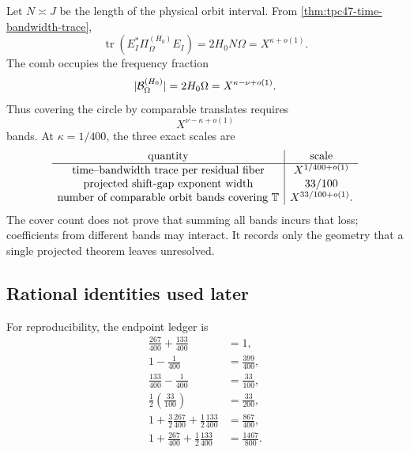 Let \(N\asymp J\) be the length of the physical orbit interval.  From
\cref{thm:tpc47-time-bandwidth-trace},
\begin{equation}
 \operatorname{tr}
 (E_I^*\Pi_{\Omega}^{(H_0)}E_I)
 =2H_0N\Omega
 =X^{\kappa+o(1)}.
 \label{eq:tpc47-shannon-exponent}
\end{equation}
The comb occupies the frequency fraction
\begin{equation}
 |\mathcal B_{\Omega}^{(H_0)}|
 =2H_0\Omega=X^{\kappa-\nu+o(1)}.
 \label{eq:tpc47-band-fraction}
\end{equation}
Thus covering the circle by comparable translates requires
\begin{equation}
 X^{\nu-\kappa+o(1)}
 \label{eq:tpc47-cover-count}
\end{equation}
bands.  At \(\kappa=1/400\), the three exact scales are
\begin{equation}
 \begin{array}{c|c}
 \text{quantity}&\text{scale}\\ \hline
 \text{time--bandwidth trace per residual fiber}
   &X^{1/400+o(1)}\\
 \text{projected shift-gap exponent width}
   &33/100\\
 \text{number of comparable orbit bands covering }\mathbb T
   &X^{33/100+o(1)}.
 \end{array}
 \label{eq:tpc47-three-scale-table}
\end{equation}
The cover count does not prove that summing all bands incurs that loss;
coefficients from different bands may interact.  It records only the
geometry that a single projected theorem leaves unresolved.

\subsection{Rational identities used later}

For reproducibility, the endpoint ledger is
\begin{align}
 \frac{267}{400}+\frac{133}{400}&=1,
 \label{eq:tpc47-rational-sum}\\
 1-\frac1{400}&=\frac{399}{400},
 \label{eq:tpc47-rational-lower}\\
 \frac{133}{400}-\frac1{400}
 &=\frac{33}{100},
 \label{eq:tpc47-rational-width}\\
 \frac12\left(\frac{33}{100}\right)&=\frac{33}{200},
 \label{eq:tpc47-rational-epsilon}\\
 1+\frac32\frac{267}{400}
 +\frac12\frac{133}{400}&=\frac{867}{400},
 \label{eq:tpc47-rational-full-prefactor}\\
 1+\frac{267}{400}
 +\frac12\frac{133}{400}&=\frac{1467}{800}.
 \label{eq:tpc47-rational-row-prefactor}
\end{align}
